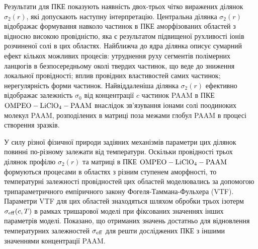 Результати для ПКЕ показують наявність двох-трьох чітко виражених
ділянок $\sigma_2(r)$, які допускають наступну інтерпретацію. Центральна ділянка
$\sigma_2(r)$ відображає формування навколо частинок в ПКЕ аморфізованих областей з відносно високою провідністю, яка є результатом підвищеної рухливості іонів розчиненої солі в цих областях. Найближча до ядра ділянка описує сумарний ефект кількох можливих процесів: утруднення руху сегментів полімерних ланцюгів в безпосередньому околі твердих частинок, що веде до зниження локальної провідності; вплив провідних властивостей самих частинок;
нерегулярність форми частинок. Найвіддаленіша ділянка $\sigma_2(r)$ ефективно
відображає залежність $\sigma_0$ від концентрації $c$ частинок PAAM в ПКЕ $\rm OMPEO-LiClO_4-PAAM$ внаслідок зв'язування іонами солі поодиноких молекул PAAM, розподілених в матриці поза межами глобул PAAM в процесі створення зразків.

У силу різної фізичної природи задіяних механізмів параметри цих ділянок повинні по-різному залежати від температури. Оскільки
провідності трьох ділянок профілю $\sigma_2(r)$ та матриці в ПКЕ $\rm OMPEO-LiClO_4-PAAM$ формуються процесами в областях з різним ступенем аморфності, то температурні залежності провідностей цих областей моделювались за допомогою трипараметричного емпіричного закону Фогеля-Таммана-Фульхера (VTF). Параметри VTF для цих областей знаходяться шляхом обробки трьох ізотерм $\sigma_{\rm eff} (c,T)$ в рамках тришарової моделі при фіксованих значеннях інших параметрів моделі. Показано, що отриманих значень достатньо для
відновлення температурних залежностей $\sigma_{\rm eff}$ для решти досліджених ПКЕ з іншими значеннями концентрації PAAM.

